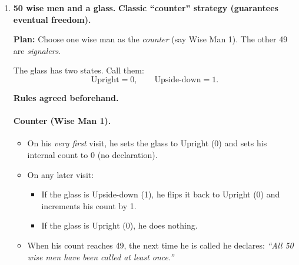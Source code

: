 \documentclass[11pt]{article}
\begin{document}
\begin{enumerate}[label=\textbf{\arabic*.}]
So we choose floors so that the remaining worst-case trials are balanced.

Let the first drop be from floor \(n\). If it breaks, we may need up to \(n-1\) more drops (linear search) $\Rightarrow$ worst-case \(n\).
If it survives, next drop should be \(n+(n-1)\), so that if it breaks there, we have at most \(n-1\) remaining linear checks, giving worst-case still \(n\).

Continue with decreasing steps:
\[
n,\quad n+(n-1),\quad n+(n-1)+(n-2),\ \dots
\]
We need the sum \(n+(n-1)+\cdots+1=\frac{n(n+1)}{2}\) to be at least 100.

Solve:
\[
\frac{n(n+1)}{2}\ge 100.
\]
Check \(n=13\): \(13\cdot 14/2=91<100\).  
Check \(n=14\): \(14\cdot 15/2=105\ge 100\).

So the optimal minimax number is \(\boxed{14}\) drops.

\medskip
\noindent\textbf{Concrete schedule:}
Drop ball 1 from floors:
\[
14,\ 27,\ 39,\ 50,\ 60,\ 69,\ 77,\ 84,\ 90,\ 95,\ 99,\ 100
\]
(using step sizes 14,13,12,11,10,9,8,7,6,5,4,1).
When it breaks, use ball 2 to search linearly between the last safe floor + 1 and the breaking floor - 1.

Worst case: 14 drops.

\hfill{\small\textit{Ref: A Practical Guide, Ch.\ 2, ``Glass ball''}}

\item \textbf{50 wise men and a glass.}
\textbf{Classic ``counter'' strategy (guarantees eventual freedom).}

\medskip
\noindent\textbf{Plan:} Choose one wise man as the \emph{counter} (say Wise Man 1). The other 49 are \emph{signalers}.

The glass has two states. Call them:
\[
\text{Upright} = 0,\qquad \text{Upside-down} = 1.
\]

\medskip
\noindent\textbf{Rules agreed beforehand.}

\paragraph{Counter (Wise Man 1).}
\begin{itemize}
\item On his \emph{very first} visit, he sets the glass to Upright (0) and sets his internal count to 0 (no declaration).
\item On any later visit:
  \begin{itemize}
  \item If the glass is Upside-down (1), he flips it back to Upright (0) and increments his count by 1.
  \item If the glass is Upright (0), he does nothing.
  \end{itemize}
\item When his count reaches 49, the next time he is called he declares: \emph{``All 50 wise men have been called at least once.''}
\end{itemize}


\end{enumerate}
\end{document}
